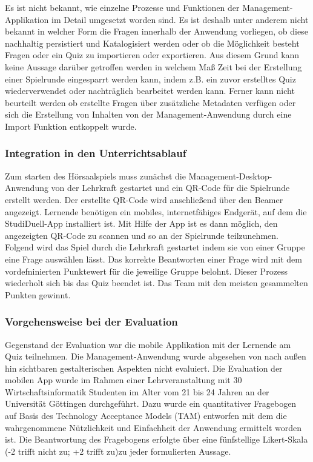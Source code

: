\documentclass[conference]{IEEEtran}
\begin{document}
Es ist nicht bekannt, wie einzelne Prozesse und Funktionen der Management-Applikation im Detail umgesetzt worden sind. Es ist deshalb unter anderem nicht bekannt in welcher Form die Fragen innerhalb der Anwendung vorliegen, ob diese nachhaltig persistiert und Katalogisiert werden oder ob die Möglichkeit besteht Fragen oder ein Quiz zu importieren oder exportieren. Aus diesem Grund kann keine Aussage darüber getroffen werden in welchem Maß Zeit bei der Erstellung einer Spielrunde eingesparrt werden kann, indem z.B. ein zuvor erstelltes Quiz wiederverwendet oder nachträglich bearbeitet werden kann. Ferner kann nicht beurteilt werden ob erstellte Fragen über zusätzliche Metadaten verfügen oder sich die Erstellung von Inhalten von der Management-Anwendung durch eine Import Funktion entkoppelt wurde. 
\\
\subsubsection{Integration in den Unterrichtsablauf}
Zum starten des Hörsaalspiels muss zunächst die Management-Desktop-Anwendung von der Lehrkraft gestartet und ein QR-Code für die Spielrunde erstellt werden. Der erstellte QR-Code wird anschließend über den Beamer angezeigt. Lernende benötigen ein mobiles, internetfähiges Endgerät, auf dem die StudiDuell-App installiert ist. Mit Hilfe der App ist es dann möglich, den angezeigten QR-Code zu scannen und so an der Spielrunde teilzunehmen. Folgend wird das Spiel durch die Lehrkraft gestartet indem sie von einer Gruppe eine Frage auswählen lässt. Das korrekte Beantworten einer Frage wird mit dem vordefninierten Punktewert für die jeweilige Gruppe belohnt. Dieser Prozess wiederholt sich bis das Quiz beendet ist. Das Team mit den meisten gesammelten Punkten gewinnt. \cite[p. 340f]{Hobert2017}

\subsubsection{Vorgehensweise bei der Evaluation}
Gegenstand der Evaluation war die mobile Applikation mit der Lernende am Quiz teilnehmen. Die Management-Anwendung wurde abgesehen von nach außen hin sichtbaren gestalterischen Aspekten nicht evaluiert. Die Evaluation der mobilen App wurde im Rahmen einer Lehrveranstaltung mit 30 Wirtschaftsinformatik Studenten im Alter vom 21 bis 24 Jahren an der Universität Göttingen durchgeführt. Dazu wurde ein quantitativer Fragebogen auf Basis des Technology Acceptance Models (TAM) \cite[p. 985]{Davis1989} entworfen mit dem die wahrgenommene Nützlichkeit und Einfachheit der Anwendung ermittelt worden ist. Die Beantwortung des Fragebogens erfolgte über eine fünfstellige Likert-Skala (-2 trifft nicht zu; +2 trifft zu)zu jeder formulierten Aussage. \cite[p. 342]{Hobert2017}
\end{document}
